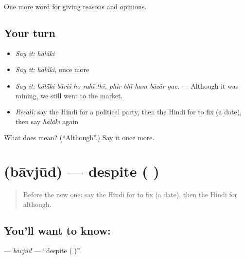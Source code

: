 \begin{grammarlens}[title={What you've built}]
One more word for giving reasons and opinions.
\end{grammarlens}

\subsection*{Your turn}
\begin{itemize}
\raggedright
  \item \emph{Say it:} \emph{hālā̃ki}
  \item \emph{Say it:} \emph{hālā̃ki}, once more
  \item \emph{Say it:} \emph{hālā̃ki bāriś ho rahī thī, phir bhī ham bāzār gae.} — Although it was raining, we still went to the market.
  \item \emph{Recall:} say the Hindi for a political party, then the Hindi for to fix (a date), then say \emph{hālā̃ki} again
\end{itemize}

\begin{tcolorbox}[breakable,colback=teal!4,colframe=teal!35!black,title={Before you move on}]
What does  mean? (\textquotedblleft{}Although\textquotedblright{}.) Say it once more.
\end{tcolorbox}
\section[\texorpdfstring{\hi{बावजूद} (bāvjūd)}{बावजूद (bāvjūd)}]{ (bāvjūd) — despite ( )}

\label{lesson:HI-C371-bavjud}



\begin{quote}
Before the new one: say the Hindi for to fix (a date), then the Hindi for although.
\end{quote}

\subsection*{You'll want to know: }
\textbf{} — \emph{bāvjūd} — \textquotedblleft{}despite ( )\textquotedblright{}.

\begin{quote}
      
\end{quote}

